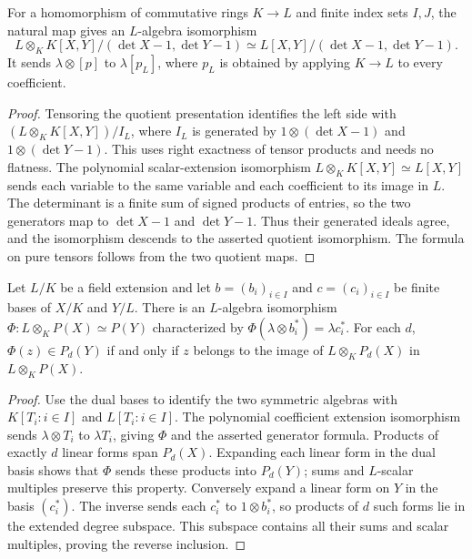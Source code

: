 \begin{lemma}
\label{lem:balanced-coordinate-base-change}
\leanok
For a homomorphism of commutative rings $K\to L$ and finite index sets
$I,J$, the natural map gives an $L$-algebra isomorphism
\[
 L\otimes_K K[X,Y]/(\det X-1,\det Y-1)
 \simeq L[X,Y]/(\det X-1,\det Y-1).
\]
It sends $\lambda\otimes[p]$ to $\lambda[p_L]$, where $p_L$ is obtained
by applying $K\to L$ to every coefficient.
\end{lemma}
\begin{proof}
Tensoring the quotient presentation identifies the left side with
$(L\otimes_K K[X,Y])/I_L$, where $I_L$ is generated by
$1\otimes(\det X-1)$ and $1\otimes(\det Y-1)$.
This uses right exactness of tensor products and needs no flatness.
The polynomial scalar-extension isomorphism
$L\otimes_K K[X,Y]\simeq L[X,Y]$ sends each variable to the same
variable and each coefficient to its image in $L$. The determinant
is a finite sum of signed products of entries, so the two generators
map to $\det X-1$ and $\det Y-1$. Thus their generated ideals agree,
and the isomorphism descends to the asserted quotient isomorphism.
The formula on pure tensors follows from the two quotient maps.
\end{proof}

\begin{lemma}
\label{lem:balanced-polynomial-base-change}
\leanok
Let $L/K$ be a field extension and let $b=(b_i)_{i\in I}$ and
$c=(c_i)_{i\in I}$ be finite bases of $X/K$ and $Y/L$. There is an
$L$-algebra isomorphism
$\Phi:L\otimes_K P(X)\simeq P(Y)$ characterized by
$\Phi(\lambda\otimes b_i^*)=\lambda c_i^*$.
For each $d$, $\Phi(z)\in P_d(Y)$ if and only if $z$ belongs to the
image of $L\otimes_KP_d(X)$ in $L\otimes_KP(X)$.
\end{lemma}
\begin{proof}
Use the dual bases to identify the two symmetric algebras with
$K[T_i:i\in I]$ and $L[T_i:i\in I]$. The polynomial coefficient
extension isomorphism sends $\lambda\otimes T_i$ to $\lambda T_i$,
giving $\Phi$ and the asserted generator formula. Products of exactly
$d$ linear forms span $P_d(X)$. Expanding each linear form in the dual
basis shows that $\Phi$ sends these products into $P_d(Y)$; sums and
$L$-scalar multiples preserve this property. Conversely expand a linear
form on $Y$ in the basis $(c_i^*)$. The inverse sends each $c_i^*$ to
$1\otimes b_i^*$, so products of $d$ such forms lie in the extended
degree subspace. This subspace contains all their sums and scalar
multiples, proving the reverse inclusion.
\end{proof}

